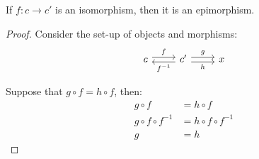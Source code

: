 \begin{theorem}
  If $f:c\to c'$ is an isomorphism, then it is an epimorphism.

  \begin{proof}
    Consider the set-up of objects and morphisms:
    \[\begin{tikzcd}[ampersand replacement=\&]
      c \& {c'} \& x
      \arrow["f", shift left=1, from=1-1, to=1-2]
      \arrow["{f^{-1}}", shift left=1, from=1-2, to=1-1]
      \arrow["g", shift left=1, from=1-2, to=1-3]
      \arrow["h"', shift right=1, from=1-2, to=1-3]
    \end{tikzcd}\]

    Suppose that $g \circ f = h \circ f$, then:
    \[
      \begin{aligned}
        g \circ f &= h \circ f\\
        g \circ f \circ f^{-1} &= h \circ f \circ f^{-1}\\
        g &= h
      \end{aligned}
    \]
  \end{proof}
\end{theorem}